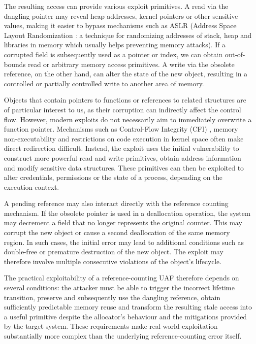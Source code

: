 The resulting access can provide various exploit primitives. A read via the dangling pointer may reveal heap addresses, kernel pointers or other sensitive values, making it easier to bypass mechanisms such as ASLR (Address Space Layout Randomization \cite{bib:aslr}: a technique for randomizing addresses of stack, heap and libraries in memory which usually helps preventing memory attacks). If a corrupted field is subsequently used as a pointer or index, we can obtain out-of-bounds read or arbitrary memory access primitives. A write via the obsolete reference, on the other hand, can alter the state of the new object, resulting in a controlled or partially controlled write to another area of memory.

Objects that contain pointers to functions or references to related structures are of particular interest to us, as their corruption can indirectly affect the control flow. However, modern exploits do not necessarily aim to immediately overwrite a function pointer. Mechanisms such as Control-Flow Integrity (CFI) \cite{bib:cfi}, memory non-executability and restrictions on code execution in kernel space often make direct redirection difficult. Instead, the exploit uses the initial vulnerability to construct more powerful read and write primitives, obtain address information and modify sensitive data structures. These primitives can then be exploited to alter credentials, permissions or the state of a process, depending on the execution context.

A pending reference may also interact directly with the reference counting mechanism. If the obsolete pointer is used in a deallocation operation, the system may decrement a field that no longer represents the original counter. This may corrupt the new object or cause a second deallocation of the same memory region. In such cases, the initial error may lead to additional conditions such as double-free or premature destruction of the new object. The exploit may therefore involve multiple consecutive violations of the object's lifecycle.

The practical exploitability of a reference-counting UAF therefore depends on several conditions: the attacker must be able to trigger the incorrect lifetime transition, preserve and subsequently use the dangling reference, obtain sufficiently predictable memory reuse and transform the resulting stale access into a useful primitive despite the allocator's behaviour and the mitigations provided by the target system. These requirements make real-world exploitation substantially more complex than the underlying reference-counting error itself.


